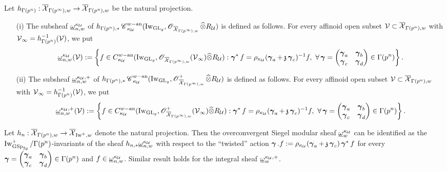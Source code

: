 \begin{Definition}\label{Definition: overconvergent automorphic sheaf at Gamma(p^n)}
Let $h_{\Gamma(p^n)}: \overline{\calX}_{\Gamma(p^{\infty}),w}\rightarrow \overline{\calX}_{\Gamma(p^n),w}$ be the natural projection. 
\begin{enumerate}
\item[(i)] The subsheaf $\underline{\omega}_{n,w}^{\kappa_{\calU}}$ of $h_{\Gamma(p^n), *}\scrC^{w-\an}_{\kappa_{\calU}}(\Iw_{\GL_g}, \scrO_{\overline{\calX}_{\Gamma(p^{\infty}), w}}\widehat{\otimes}R_{\calU})$ is defined as follows. For every affinoid open subset $\calV\subset \overline{\calX}_{\Gamma(p^n), w}$ with $\calV_{\infty} = h_{\Gamma(p^n)}^{-1}(\calV)$, we put $$\underline{\omega}_{n,w}^{\kappa_{\calU}}(\calV):=\left\{f\in C^{w-\an}_{\kappa_{\calU}}(\Iw_{\GL_g}, \scrO_{\overline{\calX}_{\Gamma(p^{\infty}), w}}(\calV_{\infty})\widehat{\otimes}R_{\calU}): \bfgamma^*f=\rho_{\kappa_{\calU}}(\bfgamma_a+\frakz\bfgamma_c)^{-1} f,\,\,\forall \bfgamma=\begin{pmatrix}\bfgamma_a & \bfgamma_b\\ \bfgamma_c & \bfgamma_d\end{pmatrix}\in \Gamma(p^n)\right\}.$$ 
\item[(ii)] The subsheaf $\underline{\omega}_{n,w}^{\kappa_{\calU},+}$ of $h_{\Gamma(p^n), *}\scrC^{w-\an}_{\kappa_{\calU}}(\Iw_{\GL_g}, \scrO^+_{\overline{\calX}_{\Gamma(p^{\infty}), w}}\widehat{\otimes}R_{\calU})$ is defined as follows. For every affinoid open subset $\calV\subset \overline{\calX}_{\Gamma(p^n), w}$ with $\calV_{\infty} = h_{\Gamma(p^n)}^{-1}(\calV)$, we put $$\underline{\omega}_{n,w}^{\kappa_{\calU},+}(\calV):=\left\{f\in C^{w-\an}_{\kappa_{\calU}}(\Iw_{\GL_g}, \scrO^+_{\overline{\calX}_{\Gamma(p^{\infty}), w}}(\calV_{\infty})\widehat{\otimes}R_{\calU}): \bfgamma^*f=\rho_{\kappa_{\calU}}(\bfgamma_a+\frakz\bfgamma_c)^{-1} f,\,\,\forall \bfgamma=\begin{pmatrix}\bfgamma_a & \bfgamma_b\\ \bfgamma_c & \bfgamma_d\end{pmatrix}\in \Gamma(p^n)\right\}.$$ 
\end{enumerate}
\end{Definition}

\begin{Remark}\label{remark: invariants}
\normalfont Let $h_n: \overline{\calX}_{\Gamma(p^n),w}\rightarrow \overline{\calX}_{\Iw^+,w}$ denote the natural projection. Then the overconvergent Siegel modular sheaf $\underline{\omega}^{\kappa_{\calU}}_w$ can be identified as the $\Iw^+_{\GSp_{2g}}/\Gamma(p^n)$-invariants of the sheaf $h_{n,*}\underline{\omega}_{n,w}^{\kappa_{\calU}}$ with respect to the ``twisted'' action
$\bfgamma.f:=\rho_{\kappa_{\calU}}(\bfgamma_a+\frakz\bfgamma_c) \bfgamma^*f$
for every $\bfgamma=\begin{pmatrix}\bfgamma_a & \bfgamma_b\\ \bfgamma_c & \bfgamma_d\end{pmatrix}\in \Gamma(p^n)$ and $f\in \underline{\omega}_{n,w}^{\kappa_{\calU}}$. Similar result holds for the integral sheaf $\underline{\omega}^{\kappa_{\calU},+}_w$.
\end{Remark}

